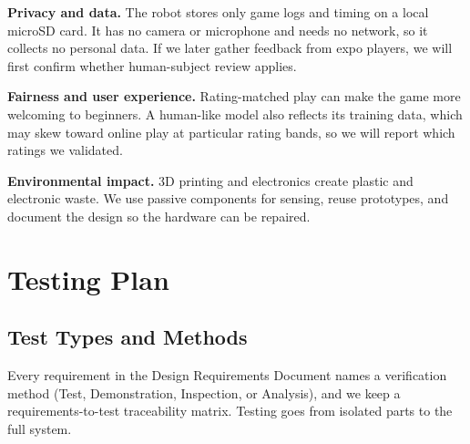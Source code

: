 \documentclass[10pt]{article}
\newcommand{\lead}[1]{\textbf{#1}}
\begin{document}
\lead{Privacy and data.} The robot stores only game logs and timing on a local microSD card. It has
no camera or microphone and needs no network, so it collects no personal data. If we later gather
feedback from expo players, we will first confirm whether human-subject review applies.

\lead{Fairness and user experience.} Rating-matched play can make the game more welcoming to
beginners. A human-like model also reflects its training data, which may skew toward online play at
particular rating bands, so we will report which ratings we validated.

\lead{Environmental impact.} 3D printing and electronics create plastic and electronic waste. We
use passive components for sensing, reuse prototypes, and document the design so the hardware can
be repaired.

\section{Testing Plan}

\subsection{Test Types and Methods}

Every requirement in the Design Requirements Document names a verification method (Test,
Demonstration, Inspection, or Analysis), and we keep a requirements-to-test traceability matrix.
Testing goes from isolated parts to the full system.
\end{document}

